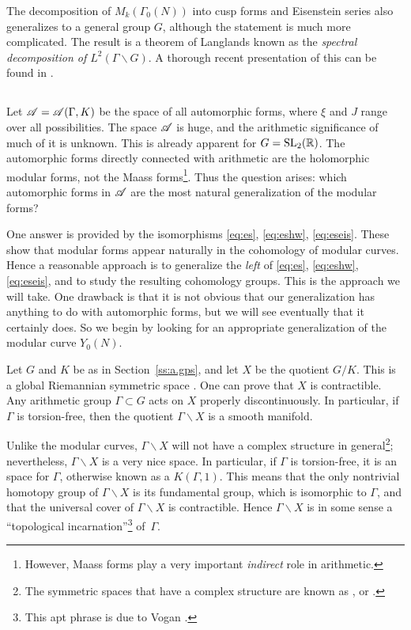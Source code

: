 The decomposition of $M_{k} (\Gamma_{0} (N))$ into cusp forms and
Eisenstein series also generalizes to a general group $G$, although
the statement is much more complicated.  The result is a theorem of
Langlands \cite{langlands} known as the {\em spectral decomposition
of $L^{2} (\Gamma \backslash G)$}.  A thorough recent presentation of
this can be found in \cite{mw}.

\subsection{}\label{ss:coho}
%
Let $\mathscr A = \mathscr A (\Gamma ,K)$ be the space of all automorphic forms,
where $\xi$ and $J$ range over all possibilities.  The space $\mathscr A$ is
huge, and the arithmetic significance of much of it is unknown.  This
is already apparent for $G=\operatorname{SL}_{2} (\mathbb{R})$.  The automorphic forms
directly connected with arithmetic are the holomorphic modular forms,
not the Maass forms\footnote{However, Maass forms play a very
important \emph{indirect} role in arithmetic.}. Thus the question
arises: which automorphic forms in $\mathscr A$ are the most natural
generalization of the modular forms?

One answer is provided by the isomorphisms \eqref{eq:es},
\eqref{eq:eshw}, \eqref{eq:eseis}.  These show that modular forms
appear naturally in the cohomology of modular curves.  Hence a
reasonable approach is to generalize the \emph{left} of \eqref{eq:es},
\eqref{eq:eshw}, \eqref{eq:eseis}, and to study the resulting
cohomology groups.  This is the approach we will take.  One drawback
is that it is not obvious that our generalization has anything to do
with automorphic forms, but we will see eventually that it certainly
does.  So we begin by looking for an appropriate generalization of the
modular curve $Y_{0} (N)$.

Let $G$ and $K$ be as in Section~\ref{ss:a.gps}, and let $X$ be the quotient
$G/K$.  This is a global Riemannian symmetric space \cite{helgason}.  One can prove
that $X$ is contractible.  Any arithmetic group $\Gamma\subset G$ acts
on $X$ properly discontinuously.  In particular, if $\Gamma$ is
torsion-free, then the quotient $\Gamma \backslash X$ is a smooth
manifold.

Unlike the modular curves, $\Gamma \backslash X$ will not have a
complex structure in general\footnote{The symmetric spaces that have
a complex structure are known as , or
 \cite{helgason}.}; nevertheless,
$\Gamma \backslash X$ is a very nice space.  In particular, if
$\Gamma$ is torsion-free, it is an  space for
$\Gamma$, otherwise known as a $K (\Gamma , 1)$.  This means that the
only nontrivial homotopy group of $\Gamma \backslash X$ is its
fundamental group, which is isomorphic to $\Gamma$, and that the
universal cover of $\Gamma \backslash X$ is contractible.  Hence
$\Gamma \backslash X$ is in some sense a ``topological 
incarnation''\footnote{This apt phrase is due to Vogan \cite{vogan}.}
of~$\Gamma$.

